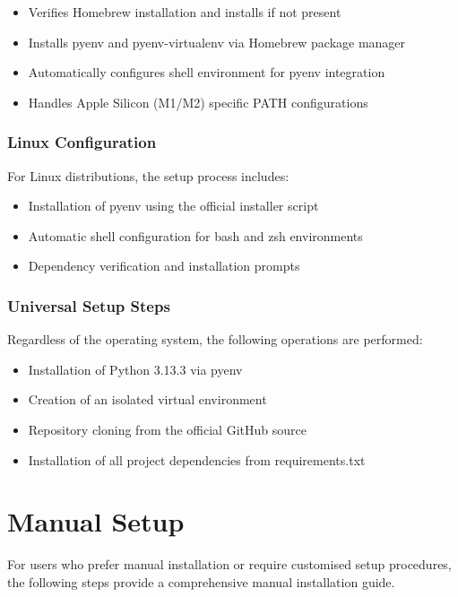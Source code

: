 \documentclass[11pt,a4paper]{article}
\begin{document}
\begin{itemize}
\item Verifies Homebrew installation and installs if not present
\item Installs pyenv and pyenv-virtualenv via Homebrew package manager
\item Automatically configures shell environment for pyenv integration
\item Handles Apple Silicon (M1/M2) specific PATH configurations
\end{itemize}

\subsubsection{Linux Configuration}

For Linux distributions, the setup process includes:

\begin{itemize}
\item Installation of pyenv using the official installer script
\item Automatic shell configuration for bash and zsh environments
\item Dependency verification and installation prompts
\end{itemize}

\subsubsection{Universal Setup Steps}

Regardless of the operating system, the following operations are performed:

\begin{itemize}
\item Installation of Python 3.13.3 via pyenv
\item Creation of an isolated virtual environment
\item Repository cloning from the official GitHub source
\item Installation of all project dependencies from requirements.txt
\end{itemize}

\section{Manual Setup}

For users who prefer manual installation or require customised setup procedures, the following steps provide a comprehensive manual installation guide.
\end{document}
